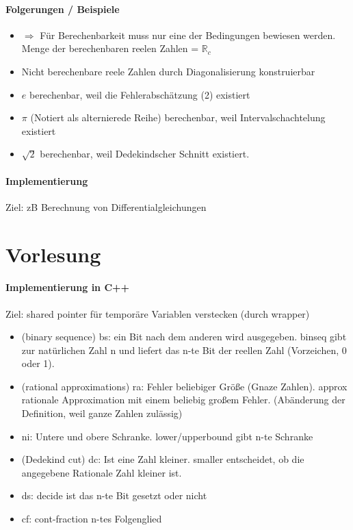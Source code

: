 \documentclass[ngerman]{scrartcl}
\begin{document}
 \paragraph{Folgerungen / Beispiele}
\begin{itemize}
  \item $ \Rightarrow $ Für Berechenbarkeit muss nur eine der Bedingungen bewiesen werden. Menge der berechenbaren reelen Zahlen = $ \mathbb{R}_c $
  \item Nicht berechenbare reele Zahlen durch Diagonalisierung konstruierbar
  \item $ e $ berechenbar, weil die Fehlerabschätzung (2) existiert
  \item $ \pi $ (Notiert als alternierede Reihe) berechenbar, weil Intervalschachtelung existiert
  \item $ \sqrt{2} $ berechenbar, weil Dedekindscher Schnitt existiert.
 \end{itemize}

\paragraph{Implementierung}
Ziel: zB Berechnung von Differentialgleichungen 

\section{Vorlesung}
\paragraph{Implementierung in C++}
Ziel: shared pointer für temporäre Variablen verstecken (durch wrapper)
\begin{itemize}
  \item (binary sequence) bs: ein Bit nach dem anderen wird ausgegeben. binseq gibt zur natürlichen Zahl n und liefert das n-te Bit der reellen Zahl (Vorzeichen, 0 oder 1).
  \item (rational approximations) ra: Fehler beliebiger Größe (Gnaze Zahlen). approx rationale Approximation mit einem beliebig großem Fehler. (Abänderung der Definition, weil ganze Zahlen zulässig)
  \item ni: Untere und obere Schranke. lower/upperbound gibt n-te Schranke
  \item (Dedekind cut) dc: Ist eine Zahl kleiner. smaller entscheidet, ob die angegebene Rationale Zahl kleiner ist.
  \item ds: decide ist das n-te Bit gesetzt oder nicht
  \item cf: cont-fraction n-tes Folgenglied
\end{itemize}
\end{document}
